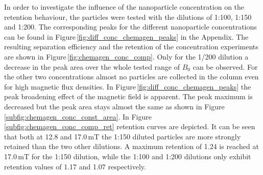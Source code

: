 In order to investigate the influence of the nanoparticle concentration on the retention behaviour, the particles were tested with the dilutions of 1:100, 1:150 and 1:200. The corresponding peaks for the different nanoparticle concentrations can be found in Figure\,\ref{fig:diff_conc_chemagen_peaks} in the Appendix. The resulting separation efficiency and the retention of the concentration experiments are shown in Figure\,\ref{fig:chemagen_conc_comp}. Only for the 1/200 dilution a decrease in the peak area over the whole tested range of $B_{0}$ can be observed. For the other two concentrations almost no particles are collected in the column even for high magnetic flux densities. In Figure\,\ref{fig:diff_conc_chemagen_peaks} the peak broadening effect of the magnetic field is apparent. The peak maximum is decreased but the peak area stays almost the same as shown in Figure\,\ref{subfig:chemagen_conc_const_area}. In Figure\,\ref{subfig:chemagen_conc_comp_ret} retention curves are depicted. It can be seen that both at 12.8 and 17.0\,mT the 1:150 diluted particles are more strongly retained than the two other dilutions. A maximum retention of 1.24 is reached at 17.0\,mT for the 1:150 dilution, while the 1:100 and 1:200 dilutions only exhibit retention values of 1.17 and 1.07 respectively. 

